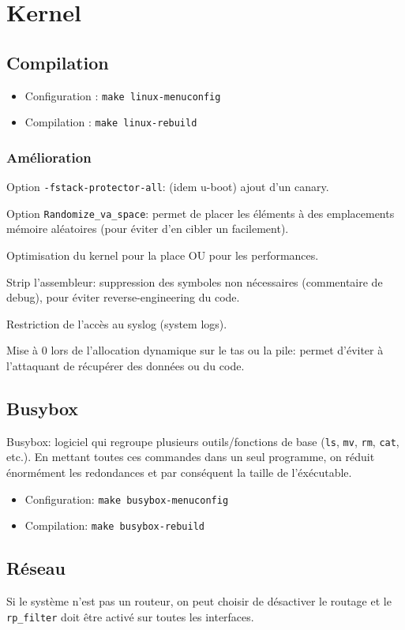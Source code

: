 \section{Kernel}
\subsection{Compilation}
\begin{itemize}
    \item Configuration : \verb!make linux-menuconfig!
    \item Compilation : \verb!make linux-rebuild!
\end{itemize}
\subsubsection{Amélioration}
Option \verb!-fstack-protector-all!: (idem u-boot) ajout d'un canary.

Option \verb!Randomize_va_space!: permet de placer les éléments à des emplacements mémoire aléatoires (pour éviter d'en cibler un facilement).

Optimisation du kernel pour la place OU pour les performances.

Strip l'assembleur: suppression des symboles non nécessaires (commentaire de debug), pour éviter reverse-engineering du code. 

Restriction de l'accès au syslog (system logs).

Mise à 0 lors de l'allocation dynamique sur le tas ou la pile: permet d'éviter à l'attaquant de récupérer des données ou du code.
\subsection{Busybox}
Busybox: logiciel qui regroupe plusieurs outils/fonctions de base (\verb+ls+, \verb+mv+, \verb+rm+, \verb+cat+, etc.). En mettant toutes ces commandes dans un seul programme, on réduit énormément les redondances et par conséquent la taille de l'éxécutable.
\begin{itemize}
    \item Configuration: \verb!make busybox-menuconfig!
    \item Compilation: \verb!make busybox-rebuild!
\end{itemize}

\subsection{Réseau}
Si le système n'est pas un routeur, on peut choisir de désactiver le routage et le \verb!rp_filter! doit être activé sur toutes les interfaces.
